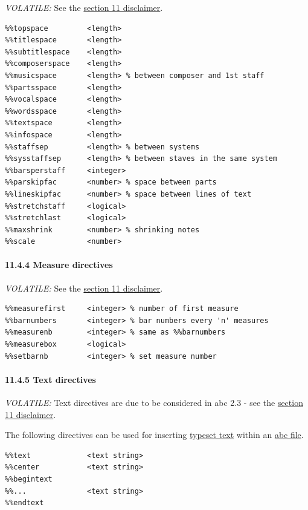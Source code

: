 \documentclass[oneside]{book}
\let\oldparagraph\paragraph
\renewcommand{\paragraph}[1]{\oldparagraph{#1}\mbox{}}
\begin{document}
\emph{VOLATILE:} See the \protect\hyperlink{disclaimer}{section 11
disclaimer}.

\begin{verbatim}
%%topspace         <length>
%%titlespace       <length>
%%subtitlespace    <length>
%%composerspace    <length>
%%musicspace       <length> % between composer and 1st staff
%%partsspace       <length>
%%vocalspace       <length>
%%wordsspace       <length>
%%textspace        <length>
%%infospace        <length>
%%staffsep         <length> % between systems
%%sysstaffsep      <length> % between staves in the same system
%%barsperstaff     <integer>
%%parskipfac       <number> % space between parts
%%lineskipfac      <number> % space between lines of text
%%stretchstaff     <logical>
%%stretchlast      <logical>
%%maxshrink        <number> % shrinking notes
%%scale            <number>
\end{verbatim}

\hypertarget{measure_directives}{\paragraph{11.4.4 Measure
directives}\label{measure_directives}}

\emph{VOLATILE:} See the \protect\hyperlink{disclaimer}{section 11
disclaimer}.

\begin{verbatim}
%%measurefirst     <integer> % number of first measure
%%barnumbers       <integer> % bar numbers every 'n' measures
%%measurenb        <integer> % same as %%barnumbers
%%measurebox       <logical>
%%setbarnb         <integer> % set measure number
\end{verbatim}

\hypertarget{text_directives}{\paragraph{11.4.5 Text
directives}\label{text_directives}}

\emph{VOLATILE:} Text directives are due to be considered in abc 2.3 -
see the \protect\hyperlink{disclaimer}{section 11 disclaimer}.

The following directives can be used for inserting
\protect\hyperlink{typeset_text_definition}{typeset text} within an
\protect\hyperlink{abc_file_definition}{abc file}.

\begin{verbatim}
%%text             <text string>
%%center           <text string>
%%begintext
%%...              <text string>
%%endtext
\end{verbatim}
\end{document}
